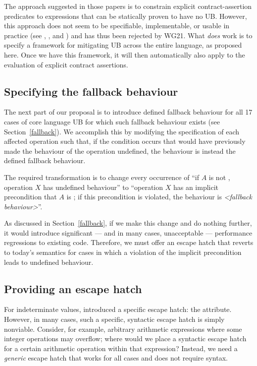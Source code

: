 {The approach suggested in those papers is to constrain explicit contract-assertion predicates to expressions that can be statically proven to have no UB. However, this approach does not seem to be specifiable, implementable, or usable in practice (see  \cite{P3376R0}, \cite{P3386R0}, and \cite{P3499R1}) and has thus been rejected by WG21. What \emph{does} work is to specify a framework for mitigating UB across the entire language, as proposed here. Once we have this framework, it will then automatically also apply to the evaluation of explicit contract assertions.

\subsection{Specifying the fallback behaviour}
\label{specifyfallback}

The next part of our proposal is to introduce defined fallback behaviour for all 17 cases of core language UB for which such fallback behaviour exists (see Section~\ref{fallback}). We accomplish this by modifying the specification of each affected operation such that, if the condition occurs that would have previously made the behaviour of the operation undefined, the behaviour is instead the defined fallback behaviour.

The required transformation is to change every occurrence of “if $A$ is not , operation $X$ has undefined behaviour'' to ``operation $X$ has an implicit precondition that $A$ is ; if this precondition is violated, the behaviour is \emph{<fallback behaviour>}''.

As discussed in Section~\ref{fallback}, if we make this change and do nothing further, it would introduce significant --- and in many cases, unacceptable --- performance regressions to existing code. Therefore, we must offer an escape hatch that reverts to today's semantics for cases in which a violation of the implicit precondition leads to undefined behaviour.

\subsection{Providing an escape hatch}
\label{assume}

For indeterminate values, \cite{P2795R5} introduced a specific escape hatch: the \tcode{[[indeterminate]]} attribute. However, in many cases, such a specific, syntactic escape hatch is simply nonviable. Consider, for example, arbitrary arithmetic expressions where some integer operations may overflow; where would we place a syntactic escape hatch for a certain arithmetic operation within that expression? Instead, we need a \emph{generic} escape hatch that works for all cases and does not require syntax.

}
